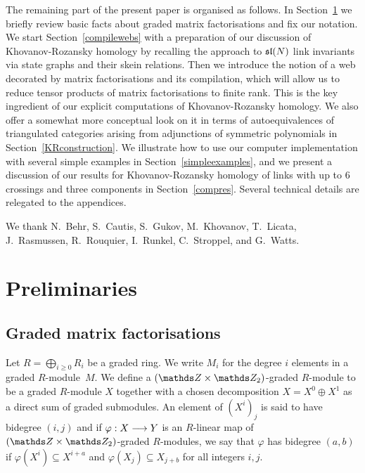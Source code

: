\documentclass{compositio}
\theoremstyle{definition}
\numberwithin{equation}{section}
\begin{document}
\medskip

The remaining part of the present paper is organised as follows. In Section~\ref{preliminaries} we briefly review basic facts about graded matrix factorisations and fix our notation. We start Section~\ref{compilewebs} with a preparation of our discussion of Khovanov-Rozansky homology by recalling the approach to $\mathfrak{sl}(N)$ link invariants via state graphs and their skein relations. Then we introduce the notion of a web decorated by matrix factorisations and its compilation, which will allow us to reduce tensor products of matrix factorisations to finite rank. This is the key ingredient of our explicit computations of Khovanov-Rozansky homology. We also offer a somewhat more conceptual look on it in terms of autoequivalences of triangulated categories arising from adjunctions of symmetric polynomials in Section~\ref{KRconstruction}. We illustrate how to use our computer implementation with several simple examples in Section~\ref{simpleexamples}, and we present a discussion of our results for Khovanov-Rozansky homology of links with up to 6 crossings and three components in Section~\ref{compres}. Several technical details are relegated to the appendices. 


\begin{acknowledgements}
We thank N.~Behr, S.~Cautis, S.~Gukov, M.~Khovanov, T.~Licata, J.~Rasmussen, R.~Rouquier, I.~Runkel, C.~Stroppel, and G.~Watts. 
\end{acknowledgements}


\section{Preliminaries}
\label{preliminaries}


\subsection{Graded matrix factorisations}

Let $R = \bigoplus_{i \ge 0} R_i$ be a graded ring. We write $M_i$ for the degree $i$ elements in a graded $R$-module~$M$. We define a $(\ZZ \times \Ztwo)$-graded $R$-module to be a graded $R$-module $X$ together with a chosen decomposition $X = X^0 \oplus X^1$ as a direct sum of graded submodules. An element of $(X^i)_j$ is said to have bidegree $(i,j)$ and if $\varphi: X \longrightarrow Y$ is an $R$-linear map of $(\ZZ \times \Ztwo)$-graded $R$-modules, we say that $\varphi$ has bidegree $(a,b)$ if $\varphi(X^i) \subseteq X^{i+a}$ and $\varphi(X_j) \subseteq X_{j+b}$ for all integers $i,j$.
\end{document}
